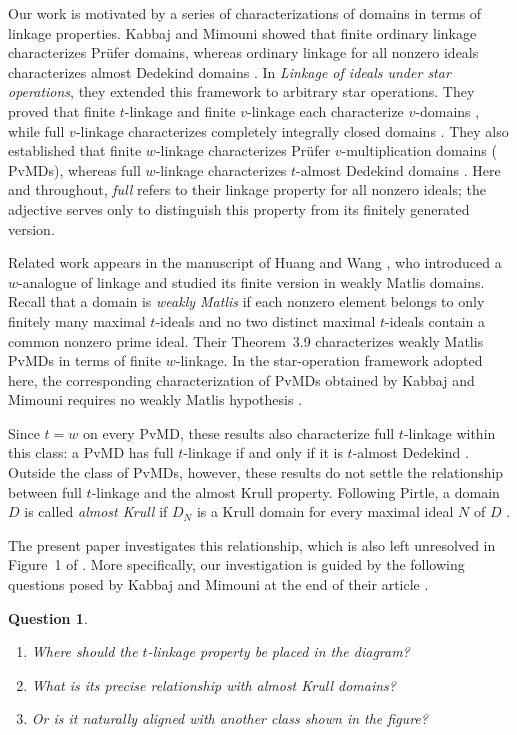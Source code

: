 \documentclass[11pt]{amsart}
\newtheorem{question}[question]{Question}
\theoremstyle{definition}
\theoremstyle{remark}
\newcommand{\PvMD}{\mathrm{PvMD}}
\begin{document}
Our work is motivated by a series of characterizations of domains in
terms of linkage properties.  Kabbaj and Mimouni showed that finite
ordinary linkage characterizes Pr\"ufer domains, whereas ordinary
linkage for all nonzero ideals characterizes almost Dedekind domains
\cite{KabbajMimouniIdeals}.  In \emph{Linkage of ideals under star
operations}, they extended this framework to arbitrary star operations.
They proved that finite $t$-linkage and finite $v$-linkage each
characterize $v$-domains \cite[Theorem~3.1]{KabbajMimouniStar}, while
full $v$-linkage characterizes completely integrally closed domains
\cite[Theorem~3.2]{KabbajMimouniStar}.  They also established that finite
$w$-linkage characterizes Pr\"ufer $v$-multiplication domains
($\PvMD$s), whereas full $w$-linkage characterizes $t$-almost Dedekind
domains \cite[Theorem~3.3]{KabbajMimouniStar}.  Here and throughout,
\emph{full} refers to their linkage property for all nonzero ideals;
the adjective serves only to distinguish this property from its
finitely generated version.

Related work appears in the manuscript of Huang and Wang
\cite{HuangWangWLinkage}, who introduced a $w$-analogue of linkage and
studied its finite version in weakly Matlis domains.  Recall that a
domain is \emph{weakly Matlis} if each nonzero element belongs to only
finitely many maximal $t$-ideals and no two distinct maximal $t$-ideals
contain a common nonzero prime ideal.  Their Theorem~3.9 characterizes
weakly Matlis $\PvMD$s in terms of finite $w$-linkage.  In the
star-operation framework adopted here, the corresponding
characterization of $\PvMD$s obtained by Kabbaj and Mimouni requires
no weakly Matlis hypothesis
\cite[Theorem~3.3]{KabbajMimouniStar}.

Since $t=w$ on every $\PvMD$, these results also characterize full
$t$-linkage within this class: a $\PvMD$ has full $t$-linkage if and
only if it is $t$-almost Dedekind
\cite[Corollary~3.4]{KabbajMimouniStar}. Outside the class of
$\PvMD$s, however, these results do not settle the relationship
between full $t$-linkage and the almost Krull property. Following
Pirtle, a domain $D$ is called \emph{almost Krull} if $D_N$ is a
Krull domain for every maximal ideal $N$ of $D$
\cite{Pirtle1968,Pirtle1969,Pirtle1970}.

The present paper investigates this relationship, which is also
left unresolved in Figure~1 of \cite{KabbajMimouniStar}.
More specifically, our investigation is guided by the following
questions posed by Kabbaj and Mimouni at the end of their article
\cite[p.~11, Open Questions]{KabbajMimouniStar}.
\begin{question}\label{q:KM}
\leavevmode
\begin{enumerate}[label=\textup{(\roman*)}]
\item Where should the $t$-linkage property be placed in the diagram?
\item What is its precise relationship with almost Krull domains?
\item Or is it naturally aligned with another class shown in the figure?
\end{enumerate}
\end{question}
\end{document}
